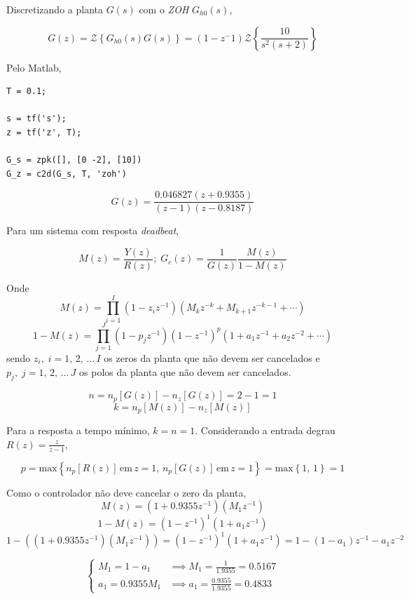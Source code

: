 \documentclass{article}
\begin{document}
        {Discretizando a planta $G(s)$ com o \textit{ZOH} $G_{h0}(s)$,}

        \[ G(z) = \mathcal{Z}\left\{ G_{h0}(s)G(s)\right\}
                = (1-z^-1)\mathcal{Z}\left\{ \frac{10}{s^2(s+2)}\right\} \]

        {Pelo Matlab,}
        \begin{lstlisting}
T = 0.1;

s = tf('s');
z = tf('z', T);

G_s = zpk([], [0 -2], [10])
G_z = c2d(G_s, T, 'zoh')
        \end{lstlisting}

        \[ G(z) = \frac{0.046827(z+0.9355)}{(z-1)(z-0.8187)} \]

        {Para um sistema com resposta \textit{deadbeat},}

        \[ M(z) = \frac{Y(z)}{R(z)};\; G_c(z) = \frac{1}{G(z)}\frac{M(z)}{1-M(z)} \]

        {Onde}
        \[ M(z) = \prod_{i=1}^I (1-z_i z^{-1}) (M_{k} z^{-k} + M_{k+1} z^{-k-1} + \cdots) \]
        \[ 1 - M(z) = \prod_{j=1}^{J} (1-p_j z^{-1})(1-z^{-1})^p (1 + a_1 z^{-1} + a_2 z^{-2} + \cdots) \]
        {sendo $z_i,\; i = 1,\, 2,\, ...\,I$ os zeros da planta que não devem
            ser cancelados e $p_j,\; j = 1,\, 2,\, ...\,J$ os polos da planta
            que não devem ser cancelados.}

        \[ n = n_p[G(z)] - n_z[G(z)] = 2 - 1 = 1 \]
        \[ k = n_p[M(z)] - n_z[M(z)] \]

        {Para a resposta a tempo mínimo, $k = n = 1$.}
        {Considerando a entrada degrau $R(z) = \frac{z}{z-1}$,}

        \[ p = \mathrm{max}\left\{ n_p[R(z)] \mathrm{\,em\,} z=1,\,
                n_p[G(z)] \mathrm{\,em\,} z=1 \right\}
             = \mathrm{max}\left\{ 1, \,1 \right\}
             = 1 \]

        {Como o controlador não deve cancelar o zero da planta,}
        \[ M(z) = (1 + 0.9355z^{-1}) (M_1 z^{-1}) \]
        \[ 1 - M(z) = (1-z^{-1})^1 (1+ a_1 z^{-1}) \]
        \[ 1 - ( (1 + 0.9355z^{-1}) (M_1 z^{-1}) ) = (1-z^{-1})^1 (1+ a_1 z^{-1})
            = 1-(1-a_1)z^{-1} - a_1 z^{-2} \]

        \[\begin{cases}
            M_1 = 1 - a_1 & \implies M_1 = \frac{1}{1.9355} = 0.5167\\
            a_1 = 0.9355M_1 & \implies a_1 = \frac{0.9355}{1.9355} = 0.4833
        \end{cases}\]
\end{document}
